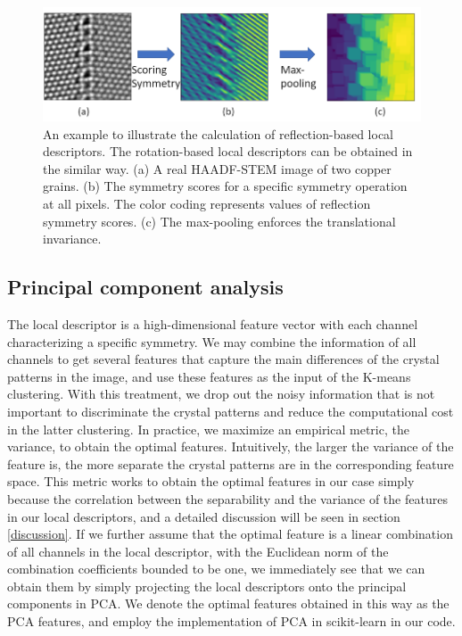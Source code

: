 \documentclass[twocolumn,amsmath, floatfix]{revtex4}
\begin{document}
\begin{figure}[htbp]
\centering
\includegraphics[width=1.\columnwidth]{reflection_descriptors.png}
\caption{An example to illustrate the calculation of reflection-based local descriptors. The rotation-based local descriptors can be obtained in the similar way. (a)  A real HAADF-STEM image of two copper grains. (b) The symmetry scores for a specific symmetry operation at all pixels. The color coding represents values of reflection symmetry scores. (c) The max-pooling enforces the translational invariance.}
\label{reflection_local_descriptors}
\end{figure}


\subsection{Principal component analysis}
The local descriptor is a high-dimensional feature vector with each channel characterizing a specific symmetry. We may combine the information of all channels to get several features that capture the main differences of the crystal patterns in the image, and use these features as the input of the K-means clustering. With this treatment, we drop out the noisy information that is not important to discriminate the crystal patterns and reduce the computational cost in the latter clustering. 
In practice, we maximize an empirical metric, the variance, to obtain the optimal features. Intuitively, the larger the variance of the feature is, the more separate the crystal patterns are in the corresponding feature space. This metric works to obtain the optimal features in our case simply because the correlation between the separability and the variance of the features in our local descriptors, and a detailed discussion will be seen in section \ref{discussion}.
If we further assume that the optimal feature is a linear combination of all channels in the local descriptor, with the Euclidean norm of the combination coefficients bounded to be one, we immediately see that we can obtain them by simply projecting the local descriptors onto the principal components in PCA. We denote the optimal features obtained in this way as the PCA features, and employ the implementation of PCA in scikit-learn \cite{scikit-learn} in our code.
\end{document}
